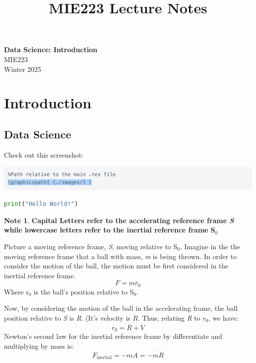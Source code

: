 \documentclass[11pt]{article}
\theoremstyle{definition}
\newtheorem{note}{Note}
\begin{document}
\setcounter{section}{0}
\title{MIE223 Lecture Notes}

\thispagestyle{empty}

\begin{center}
{\LARGE \bf Data Science: Introduction}\\
{\large MIE223}\\
Winter 2025
\end{center}
\section{Introduction}
\subsection{Data Science}
Check out this screenshot:

\includegraphics[width=\textwidth]{1.png}
\begin{lstlisting}[language=Python]
    print("Hello World!")
\end{lstlisting}
\begin{note}
\textbf{Capital Letters refer to the accelerating reference frame \textit{S} while lowercase letters refer to the inertial reference frame S$_0$}
\end{note}
Picture a moving reference frame, \textit{S}, moving relative to S$_0$. Imagine in the the moving reference frame that a ball with mass, \textit{m} is being thrown. 
In order to consider the motion of the ball, the motion must be first considered in the inertial reference frame. 
\begin{equation}
F = m\ddot{r_0}
\end{equation}
Where r$_0$ is the ball's position relative to S$_0$. 

Now, by considering the motion of the ball in the accelerating frame, the ball position relative to \textit{S} is \textit{R}. (It's velocity is $\dot{R}$. 
Thus, relating \textit{R} to $r_0$, we have: 
\begin{equation}
\dot{r_0} = \dot{R} + V
\end{equation}
Newton's second law for the inertial reference frame by differentiate and multiplying by mass is:
\begin{equation}
F_{\text{inertial}} = -mA = -m\ddot{R}
\end{equation}
\end{document}
